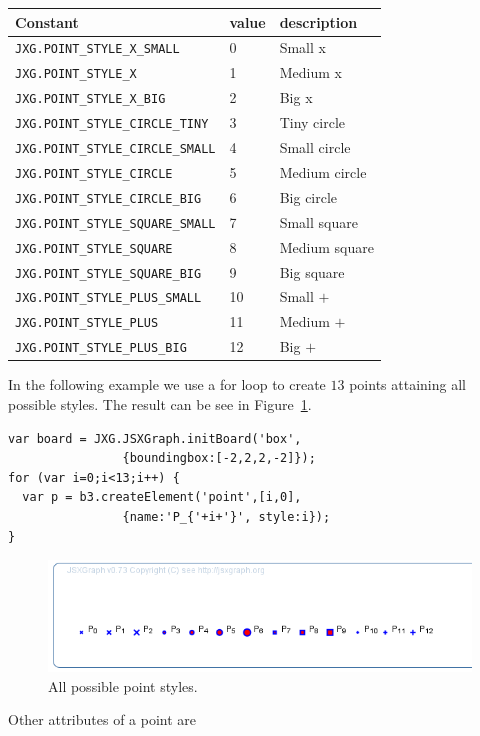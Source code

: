 \documentclass[a4paper,nols]{tufte-book}
\begin{document}
\bigskip
\begin{center}
\footnotesize
\begin{tabular}{lll}
\toprule
Constant &    value   & description \\
\midrule
\lstinline|JXG.POINT_STYLE_X_SMALL| &     0  & Small x \\
\lstinline|JXG.POINT_STYLE_X|  & 1&   Medium x \\
\lstinline|JXG.POINT_STYLE_X_BIG|  & 2  & Big x \\
\lstinline|JXG.POINT_STYLE_CIRCLE_TINY|  &   3 &  Tiny circle \\
\lstinline|JXG.POINT_STYLE_CIRCLE_SMALL|  &  4  & Small circle \\
\lstinline|JXG.POINT_STYLE_CIRCLE| & 5 &  Medium circle \\
\lstinline|JXG.POINT_STYLE_CIRCLE_BIG| & 6  & Big circle \\
\lstinline|JXG.POINT_STYLE_SQUARE_SMALL|&   7&   Small square \\
\lstinline|JXG.POINT_STYLE_SQUARE|&  8  & Medium square \\
\lstinline|JXG.POINT_STYLE_SQUARE_BIG|&  9 &  Big square \\
\lstinline|JXG.POINT_STYLE_PLUS_SMALL|&  10 & Small $+$ \\
\lstinline|JXG.POINT_STYLE_PLUS|&   11  &Medium $+$ \\
\lstinline|JXG.POINT_STYLE_PLUS_BIG| &   12  &Big $+$ \\
\bottomrule
\end{tabular}
\end{center}
In the following example we use a for loop to create $13$ points attaining all possible styles. The result can be see in Figure~\ref{fig:4}.
\begin{lstlisting}
var board = JXG.JSXGraph.initBoard('box', 
                {boundingbox:[-2,2,2,-2]});
for (var i=0;i<13;i++) {
  var p = b3.createElement('point',[i,0], 
                {name:'P_{'+i+'}', style:i});
}
\end{lstlisting}
\begin{figure}[h]
\centerline{\includegraphics[width=0.4\linewidth]{images/b5.png}}
\caption{All possible point styles.}\label{fig:4}
\end{figure}
Other attributes of a point are
\bigskip
\end{document}
